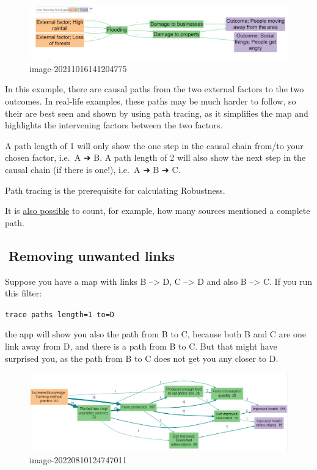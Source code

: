 \documentclass[
]{book}
\begin{document}
\begin{figure}
\centering
\includegraphics[width=6.77083in,height=\textheight]{_assets/image-20211016141204775.png}
\caption{image-20211016141204775}
\end{figure}

In this example, there are causal paths from the two external factors to the two outcomes. In real-life examples, these paths may be much harder to follow, so their are best seen and shown by using path tracing, as it simplifies the map and highlights the intervening factors between the two factors.

A path length of 1 will only show the one step in the causal chain from/to your chosen factor, i.e.~A ➜ B. A path length of 2 will also show the next step in the causal chain (if there is one!), i.e.~A ➜ B ➜ C.

Path tracing is the prerequisite for calculating Robustness.

It is \href{\%7B\#xrobustness-by-field\%7D}{also possible} to count, for example, how many sources mentioned a complete path.

\hypertarget{removing-unwanted-links}{%
\subsection{🧪Removing unwanted links}\label{removing-unwanted-links}}

Suppose you have a map with links B --\textgreater{} D, C --\textgreater{} D and also B --\textgreater{} C. If you run this filter:

\texttt{trace\ paths\ length=1\ to=D}

the app will show you also the path from B to C, because both B and C are one link away from D, and there is a path from B to C. But that might have surprised you, as the path from B to C does not get you any closer to D.

\begin{figure}
\centering
\includegraphics{_assets/image-20220810124747011.png}
\caption{image-20220810124747011}
\end{figure}
\end{document}
